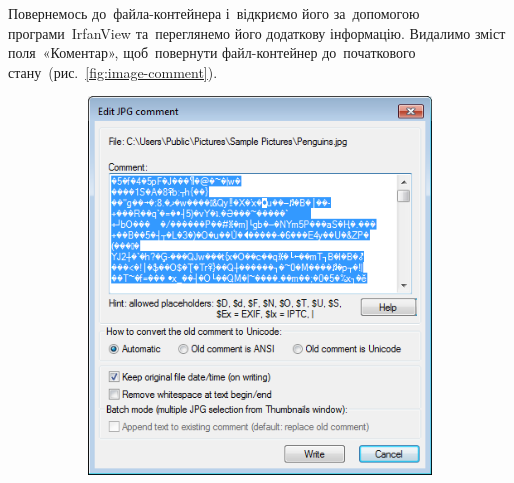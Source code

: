 \documentclass[
	a4paper,
	oneside,
	BCOR = 10mm,
	DIV = 12,
	12pt,
	headings = normal,
]{scrartcl}
\newlength{\gridunitwidth}
\begin{document}
		Повернемось до~файла-контейнера і~відкриємо його за~допомогою програми~\textenglish{IrfanView} та~переглянемо його додаткову інформацію. Видалимо зміст поля~«Коментар», щоб~повернути файл-контейнер до~початкового стану~(рис.~\ref{fig:image-comment}).

		\begin{figure}[!htbp]
			\begin{subfigure}[b]{6 \gridunitwidth - 1em / (2-1)}
				\includegraphics[width = \columnwidth]{./assets/p16.png}
				\caption{}
				\label{subfig:image-comment-before}
			\end{subfigure}%
			\hspace{1em}%
			\begin{subfigure}[b]{6 \gridunitwidth - 1em / (2-1)}

\end{subfigure}
\end{figure}
\end{document}
